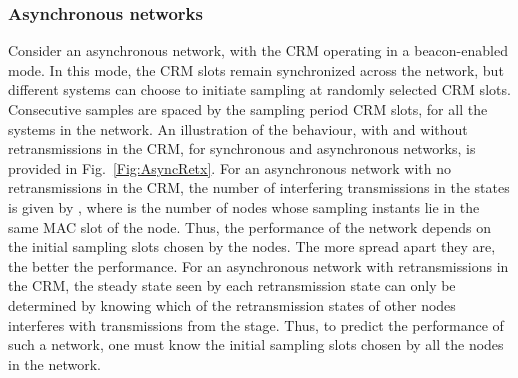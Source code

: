 \documentclass[journal]{IEEEtran}
\begin{document}
\subsubsection{Asynchronous networks}

Consider an asynchronous network, with the CRM operating in a beacon-enabled mode. In this mode, the CRM slots remain synchronized across the network, but different systems can choose to initiate sampling at randomly selected CRM slots. Consecutive samples are spaced by the sampling period  CRM slots, for all the systems in the network. An illustration of the behaviour, with and without retransmissions in the CRM, for synchronous and asynchronous networks, is provided in Fig.~\ref{Fig:AsyncRetx}. For an asynchronous network with no retransmissions in the CRM, the number of interfering transmissions in the  states is given by , where  is the number of nodes whose sampling instants lie in the same MAC slot of the  node. Thus, the performance of the network depends on the initial sampling slots chosen by the nodes. The more spread apart they are, the better the performance. For an asynchronous network with retransmissions in the CRM, the steady state seen by each retransmission state  can only be determined by knowing which of the retransmission states of other nodes interferes with transmissions from the  stage. Thus, to predict the performance of such a network, one must know the initial sampling slots chosen by all the nodes in the network.
\end{document}
